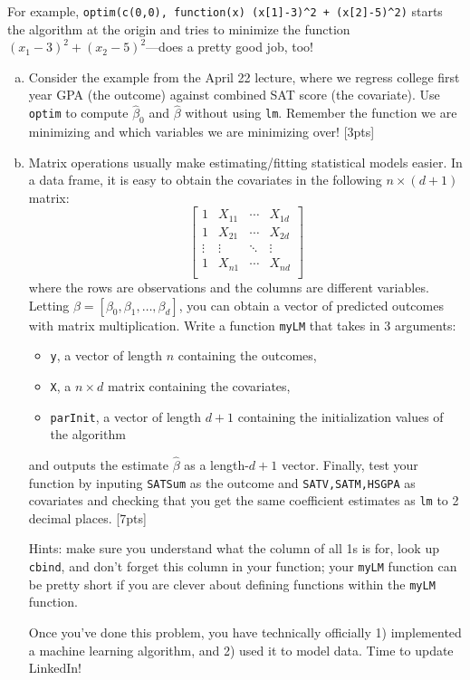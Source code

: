 \documentclass[12pt]{article}
\begin{document}
For example, \verb|optim(c(0,0), function(x) (x[1]-3)^2 + (x[2]-5)^2)| starts the algorithm at the origin and tries to minimize the function $(x_1 - 3)^2 + (x_2 - 5)^2$---does a pretty good job, too!

\begin{enumerate}[(a)]
	\item Consider the example from the April 22 lecture, where we regress college first year GPA (the outcome) against combined SAT score (the covariate). Use \verb|optim| to compute $\hat{\beta}_0$ and $\hat{\beta}$ without using \verb|lm|. Remember the function we are minimizing and which variables we are minimizing over! [3pts]
	\item Matrix operations usually make estimating/fitting statistical models easier. In a data frame, it is easy to obtain the covariates in the following $n \times (d+1)$ matrix:
	\[
	\begin{bmatrix}
	1 & X_{11} & \cdots & X_{1d} \\
	1 & X_{21} & \cdots & X_{2d} \\
	\vdots & \vdots & \ddots & \vdots \\
	1 & X_{n1} & \cdots & X_{nd} \\
	\end{bmatrix}
	\]
	where the rows are observations and the columns are different variables. Letting $\beta = [\beta_0, \beta_1, \ldots, \beta_d]$, you can obtain a vector of predicted outcomes with matrix multiplication. Write a function \verb|myLM| that takes in 3 arguments:
	\begin{itemize}
		\item \verb|y|, a vector of length $n$ containing the outcomes,
		\item \verb|X|, a $n \times d$ matrix containing the covariates,
		\item \verb|parInit|, a vector of length $d+1$ containing the initialization values of the algorithm
	\end{itemize}
	and outputs the estimate $\hat{\beta}$ as a length-$d+1$ vector. Finally, test your function by inputing \verb|SATSum| as the outcome and \verb|SATV,SATM,HSGPA| as covariates and checking that you get the same coefficient estimates as \verb|lm| to 2 decimal places. [7pts]
	
	Hints: make sure you understand what the column of all 1s is for, look up \verb|cbind|, and don't forget this column in your function; your \verb|myLM| function can be pretty short if you are clever about defining functions within the \verb|myLM| function.
	
	Once you've done this problem, you have technically officially 1) implemented a machine learning algorithm, and 2) used it to model data. Time to update LinkedIn!
\end{enumerate}
\end{document}
